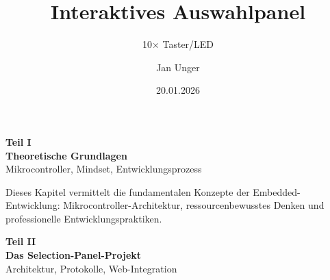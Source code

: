 \documentclass{techdoc}
\title{Interaktives Auswahlpanel}
\subtitle{10× Taster/LED}
\date{20.01.2026}
\author{Jan Unger}
\begin{document}
\maketitlepage

\tableofcontents
\clearpage
{}

{%
  \clearpage
  \vspace*{2cm}
  \begin{center}
    {\sffamily\bfseries\LARGE Teil I}\\[0.5em]
    {\sffamily\bfseries\Huge Theoretische Grundlagen}\\[1em]
    {\large\color{MutedText} Mikrocontroller, Mindset, Entwicklungsprozess}
  \end{center}
  \vspace{1cm}
}

\begin{infobox}[Ziel]
Dieses Kapitel vermittelt die fundamentalen Konzepte der Embedded-Entwicklung:
Mikrocontroller-Architektur, ressourcenbewusstes Denken und professionelle
Entwicklungspraktiken.
\end{infobox}

\clearpage


\clearpage


\clearpage


\clearpage

{%
  \clearpage
  \vspace*{2cm}
  \begin{center}
    {\sffamily\bfseries\LARGE Teil II}\\[0.5em]
    {\sffamily\bfseries\Huge Das Selection-Panel-Projekt}\\[1em]
    {\large\color{MutedText} Architektur, Protokolle, Web-Integration}
  \end{center}
  \vspace{1cm}
}
\end{document}
